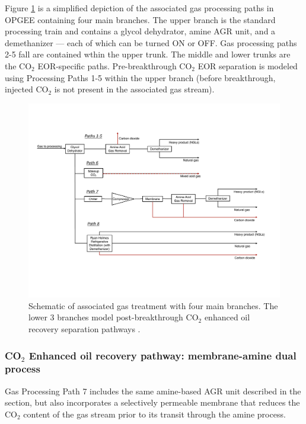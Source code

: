\documentclass[11pt]{report}
\begin{document}
{Figure \ref{fig:GasProcessingSchematic} is a simplified depiction of the associated gas processing paths in OPGEE containing four main branches. The upper branch is the standard processing train and contains a glycol dehydrator, amine AGR unit, and a demethanizer --- each of which can be turned ON or OFF. Gas processing paths 2-5 fall are contained wthin the upper trunk. The middle and lower trunks are the CO$_{2}$ EOR-specific paths. Pre-breakthrough CO$_{2}$ EOR separation is modeled using Processing Paths 1-5 within the upper branch (before breakthrough, injected CO$_2$ is not present in the associated gas stream).

\begin{landscape}
\begin{figure}[t]
\includegraphics[width=1.00\columnwidth]{images/GasProcessingSchematic.pdf}
\caption{Schematic of associated gas treatment with four main branches. The lower 3 branches model post-breakthrough CO$_{2}$ enhanced oil recovery separation pathways \cite{NETL2013}.}
\label{fig:GasProcessingSchematic}
\end{figure}
\end{landscape}




\subsubsection{CO$_{2}$ Enhanced oil recovery pathway: membrane-amine dual process} \label{MembraneAmine}

Gas Processing Path 7 includes the same amine-based AGR unit described in the  section, but also incorporates a selectively permeable membrane that reduces the CO$_{2}$ content of the gas stream prior to its transit through the amine process. 

}
\end{document}

